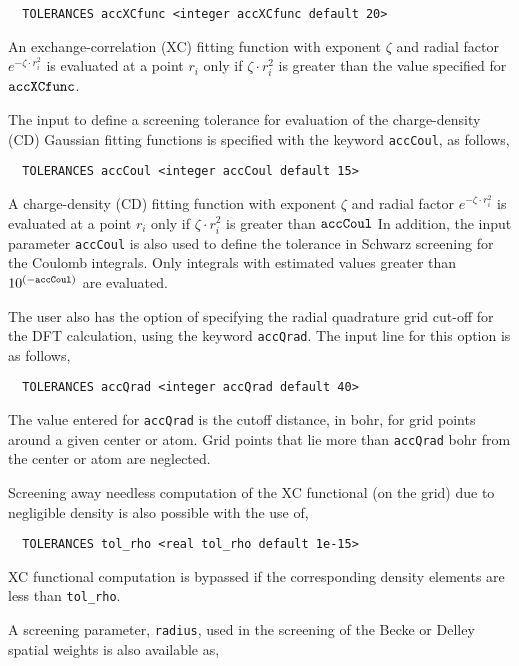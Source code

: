 \begin{verbatim}
  TOLERANCES accXCfunc <integer accXCfunc default 20>
\end{verbatim}

An exchange-correlation (XC) fitting function with exponent $\zeta$
and radial factor $e^{-\zeta\cdot r_i^2}$ is 
evaluated  at a point $r_i$ only if 
$\zeta\cdot r_i^2$ is greater than the value specified for ${\tt accXCfunc}$.

The input to define a screening tolerance for evaluation of the
charge-density (CD) Gaussian fitting functions is specified with the
keyword \verb+accCoul+, as follows,

\begin{verbatim}
  TOLERANCES accCoul <integer accCoul default 15>
\end{verbatim}

A  charge-density (CD) fitting function with exponent $\zeta$
and radial factor $e^{-\zeta\cdot r_i^2}$ is evaluated  at a 
point $r_i$ only if $\zeta\cdot r_i^2$ is greater than ${\tt accCoul}$
In addition, the input
parameter {\tt accCoul} is also used to define the tolerance  in Schwarz 
screening for the Coulomb integrals.  Only integrals with estimated
values greater than $10^{(-{\tt accCoul})}$ are evaluated.

The user also has the option of specifying the radial quadrature 
grid cut-off for the DFT calculation, using the keyword
\verb+accQrad+.  The input line for this option is as follows,

\begin{verbatim}
  TOLERANCES accQrad <integer accQrad default 40>
\end{verbatim}

The value entered for \verb+accQrad+ is the cutoff distance, in bohr, for grid
points around a given center or atom.  Grid points that lie more than 
\verb+accQrad+ bohr from the center or atom are neglected. 

Screening away needless computation of the XC functional (on the grid)
due to negligible density is also possible with the use of,

\begin{verbatim}
  TOLERANCES tol_rho <real tol_rho default 1e-15>
\end{verbatim}

XC functional computation is bypassed if the corresponding density
elements are less than \verb+tol_rho+.

A screening parameter, \verb+radius+, used in the screening of the
Becke or Delley spatial weights is also available as,


